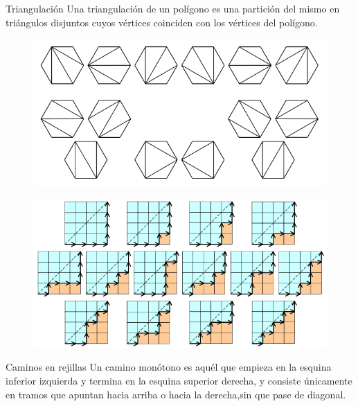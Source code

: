 \begin{frame}
\frametitle{\subsecname}

\begin{minipage}{6cm}
	\begin{block}{Triangulación}
	Una triangulación de un polígono es una partición del mismo en triángulos disjuntos cuyos vértices coinciden con los vértices del polígono.
	\end{block}
\end{minipage}
\begin{minipage}{5cm}
	\begin{figure}
		\centering
		\includegraphics[scale=0.25]{ca1}	
	\end{figure}
\end{minipage}

\begin{minipage}{6cm}
	\begin{figure}
		\centering
		\includegraphics[height=0.3\paperheight]{ca(1)}
	\end{figure}
\end{minipage}
\begin{minipage}{5.5cm}
	\begin{block}{Caminos en rejillas}
		 Un camino monótono es aquél que empieza en la esquina inferior izquierda y termina en la esquina superior derecha, y consiste únicamente en tramos que apuntan hacia arriba o hacia la derecha,sin que pase de diagonal.
	\end{block}
\end{minipage}
\end{frame}
